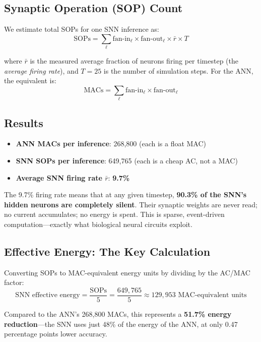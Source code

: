 \documentclass[12pt]{article}
\begin{document}
\subsection*{Synaptic Operation (SOP) Count}
We estimate total SOPs for one SNN inference as:
\begin{equation}
    \text{SOPs} = \sum_{\ell} \text{fan-in}_\ell \times \text{fan-out}_\ell \times \bar{r} \times T
\end{equation}

where $\bar{r}$ is the measured average fraction of neurons firing per timestep (the \textit{average firing rate}), and $T=25$ is the number of simulation steps. For the ANN, the equivalent is:
\begin{equation}
    \text{MACs} = \sum_{\ell} \text{fan-in}_\ell \times \text{fan-out}_\ell
\end{equation}

\subsection*{Results}
\begin{itemize}
    \item \textbf{ANN MACs per inference}: 268,800 (each is a float MAC)
    \item \textbf{SNN SOPs per inference}: 649,765 (each is a cheap AC, not a MAC)
    \item \textbf{Average SNN firing rate $\bar{r}$}: \textbf{9.7\%}
\end{itemize}

The 9.7\% firing rate means that at any given timestep, \textbf{90.3\% of the SNN's hidden neurons are completely silent}. Their synaptic weights are never read; no current accumulates; no energy is spent. This is sparse, event-driven computation—exactly what biological neural circuits exploit.

\subsection*{Effective Energy: The Key Calculation}
Converting SOPs to MAC-equivalent energy units by dividing by the AC/MAC factor:
\begin{equation}
    \text{SNN effective energy} = \frac{\text{SOPs}}{5} = \frac{649{,}765}{5} \approx 129{,}953 \text{ MAC-equivalent units}
\end{equation}

Compared to the ANN's 268,800 MACs, this represents a \textbf{51.7\% energy reduction}—the SNN uses just 48\% of the energy of the ANN, at only 0.47 percentage points lower accuracy.
\end{document}
